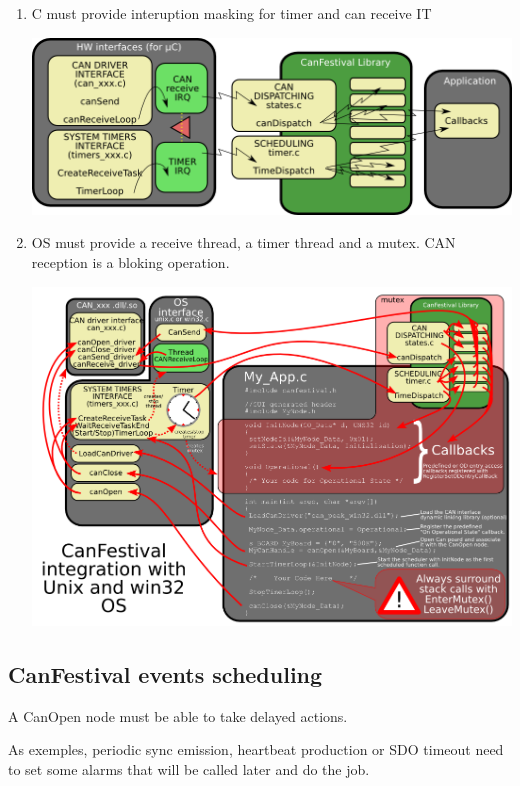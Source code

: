 \documentclass[12pt,twoside]{article}
\newcommand\liststyleLvi{%
\renewcommand\labelitemi{{--}}
\renewcommand\labelitemii{{--}}
\renewcommand\labelitemiii{{--}}
\renewcommand\labelitemiv{{--}}
}
\begin{document}
\liststyleLvi
\begin{enumerate}
\item {\textmu}C must provide interuption masking for timer and can
receive IT\newline
 \begin{center}
   \includegraphics[width=16cm]{Pictures/10000201000003CA0000016604E6A5EF.png}
\end{center}
\item OS must provide a receive thread, a timer thread and a mutex. CAN
reception is a bloking operation.\newline
\begin{center}
   \includegraphics[width=16cm]{Pictures/10000201000003F9000002CF8B0CDAEA.png}
\end{center}
\end{enumerate}
\subsection{CanFestival events scheduling}
A CanOpen node must be able to take delayed actions.

As exemples, periodic sync emission, heartbeat production or SDO timeout
need to set some alarms that will be called later and do the job.
\end{document}
